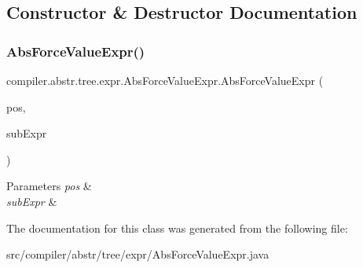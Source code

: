 \subsection{Constructor \& Destructor Documentation}
\mbox{\label{classcompiler_1_1abstr_1_1tree_1_1expr_1_1_abs_force_value_expr_a00245c7f119734a374df1c722a68f325}} 
\subsubsection{\texorpdfstring{Abs\+Force\+Value\+Expr()}{AbsForceValueExpr()}}
{\footnotesize\ttfamily compiler.\+abstr.\+tree.\+expr.\+Abs\+Force\+Value\+Expr.\+Abs\+Force\+Value\+Expr (\begin{DoxyParamCaption}\item[{\hyperlink{classcompiler_1_1_position}{Position}}]{pos,  }\item[{\hyperlink{classcompiler_1_1abstr_1_1tree_1_1expr_1_1_abs_expr}{Abs\+Expr}}]{sub\+Expr }\end{DoxyParamCaption})}


\begin{DoxyParams}{Parameters}
{\em pos} & \\
\hline
{\em sub\+Expr} & \\
\hline
\end{DoxyParams}


The documentation for this class was generated from the following file\+:\begin{DoxyCompactItemize}
\item 
src/compiler/abstr/tree/expr/Abs\+Force\+Value\+Expr.\+java\end{DoxyCompactItemize}
